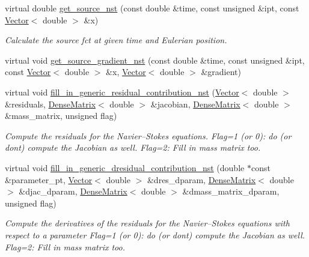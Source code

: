 \begin{DoxyCompactItemize}
\item 
virtual double \hyperlink{classoomph_1_1GeneralisedNewtonianNavierStokesEquations_a0c3463fa41028b3acebcdca1a1ca2d55}{get\+\_\+source\+\_\+nst} (const double \&time, const unsigned \&ipt, const \hyperlink{classoomph_1_1Vector}{Vector}$<$ double $>$ \&x)
\begin{DoxyCompactList}\small\item\em Calculate the source fct at given time and Eulerian position. \end{DoxyCompactList}\item 
virtual void \hyperlink{classoomph_1_1GeneralisedNewtonianNavierStokesEquations_ac3e66e5ca9d23b4ef96a32064bae84b9}{get\+\_\+source\+\_\+gradient\+\_\+nst} (const double \&time, const unsigned \&ipt, const \hyperlink{classoomph_1_1Vector}{Vector}$<$ double $>$ \&x, \hyperlink{classoomph_1_1Vector}{Vector}$<$ double $>$ \&gradient)
\item 
virtual void \hyperlink{classoomph_1_1GeneralisedNewtonianNavierStokesEquations_a1f89df32ac0963374166d401a7de7b8f}{fill\+\_\+in\+\_\+generic\+\_\+residual\+\_\+contribution\+\_\+nst} (\hyperlink{classoomph_1_1Vector}{Vector}$<$ double $>$ \&residuals, \hyperlink{classoomph_1_1DenseMatrix}{Dense\+Matrix}$<$ double $>$ \&jacobian, \hyperlink{classoomph_1_1DenseMatrix}{Dense\+Matrix}$<$ double $>$ \&mass\+\_\+matrix, unsigned flag)
\begin{DoxyCompactList}\small\item\em Compute the residuals for the Navier--Stokes equations. Flag=1 (or 0)\+: do (or don\textquotesingle{}t) compute the Jacobian as well. Flag=2\+: Fill in mass matrix too. \end{DoxyCompactList}\item 
virtual void \hyperlink{classoomph_1_1GeneralisedNewtonianNavierStokesEquations_ac2caf28f72624aadf6a86e1dac0fd079}{fill\+\_\+in\+\_\+generic\+\_\+dresidual\+\_\+contribution\+\_\+nst} (double $\ast$const \&parameter\+\_\+pt, \hyperlink{classoomph_1_1Vector}{Vector}$<$ double $>$ \&dres\+\_\+dparam, \hyperlink{classoomph_1_1DenseMatrix}{Dense\+Matrix}$<$ double $>$ \&djac\+\_\+dparam, \hyperlink{classoomph_1_1DenseMatrix}{Dense\+Matrix}$<$ double $>$ \&dmass\+\_\+matrix\+\_\+dparam, unsigned flag)
\begin{DoxyCompactList}\small\item\em Compute the derivatives of the residuals for the Navier--Stokes equations with respect to a parameter Flag=1 (or 0)\+: do (or don\textquotesingle{}t) compute the Jacobian as well. Flag=2\+: Fill in mass matrix too. \end{DoxyCompactList}\item 

\end{DoxyCompactItemize}
